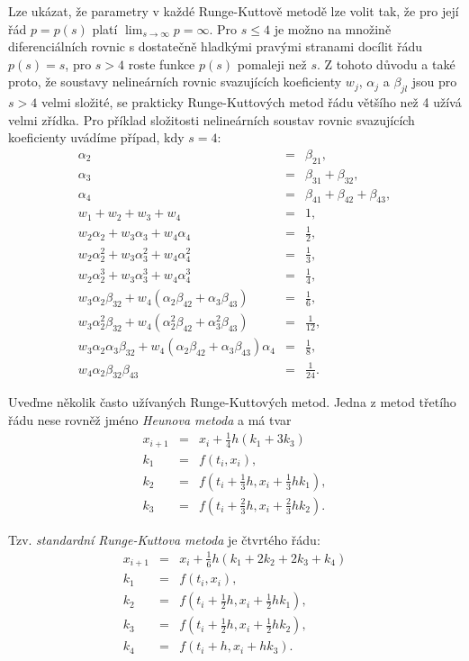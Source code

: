 \documentclass[a4paper, 12pt]{book}
\theoremstyle{definition}
\def\to{\rightarrow}
\begin{document}
Lze ukázat, že parametry v každé Runge-Kuttově metodě lze volit tak, že pro její 
řád $p=p(s)$ platí $\lim_{s\to\infty} p = \infty$. Pro $s\leq 4$ je možno na 
množině diferenciálních rovnic s dostatečně hladkými pravými stranami docílit
řádu $p(s)=s$, pro $s>4$ roste funkce $p(s)$ pomaleji než $s$. Z tohoto důvodu
a také proto, že soustavy nelineárních rovnic svazujících koeficienty $w_j$, 
$\alpha_j$ a $\beta_{jl}$ jsou pro $s>4$ velmi složité, se prakticky 
Runge-Kuttových metod řádu většího než 4 užívá velmi zřídka.
Pro příklad složitosti nelineárních soustav rovnic svazujících koeficienty 
uvádíme případ, kdy $s=4$:
\begin{eqnarray*}
\alpha_2 &=& \beta_{21},\\
\alpha_3 &=& \beta_{31}+\beta_{32},\\
\alpha_4 &=& \beta_{41}+\beta_{42}+\beta_{43},\\
w_1+w_2+w_3+w_4 &=& 1,\\
w_2\alpha_2+w_3\alpha_3+w_4\alpha_4 &=& \frac 12,\\
w_2\alpha_2^2+w_3\alpha_3^2+w_4\alpha_4^2 &=& \frac 13,\\
w_2\alpha_2^3+w_3\alpha_3^3+w_4\alpha_4^3 &=& \frac 14,\\
w_3\alpha_2\beta_{32}+w_4(\alpha_2\beta_{42}+\alpha_3\beta_{43})&=& \frac 16,\\
w_3\alpha_2^2\beta_{32}+w_4(\alpha_2^2\beta_{42}+\alpha_3^2\beta_{43})&=& \frac 1{12},\\
w_3\alpha_2\alpha_3\beta_{32}+w_4(\alpha_2\beta_{42}+\alpha_3\beta_{43})\alpha_4&=& \frac 18,\\
w_4\alpha_2\beta_{32}\beta_{43}&=& \frac 1{24}.
\end{eqnarray*}

Uveďme několik často užívaných Runge-Kuttových metod. Jedna z metod třetího 
řádu nese rovněž jméno {\em Heunova metoda} a má tvar
\begin{eqnarray*}
x_{i+1} &=& x_i+ \frac 14 h (k_1+3k_3)\\
k_1 &=& f(t_i,x_i),\\
k_2 &=& f(t_i+\frac 13 h,x_i+\frac 13 hk_1),\\
k_3 &=& f(t_i+\frac 23 h,x_i+\frac 23 hk_2).
\end{eqnarray*}

Tzv. {\em standardní Runge-Kuttova metoda} je čtvrtého řádu:
\begin{eqnarray*}
x_{i+1} &=& x_i+ \frac 16 h (k_1+2k_2+2k_3+k_4)\\
k_1 &=& f(t_i,x_i),\\
k_2 &=& f(t_i+\frac 12 h,x_i+\frac 12 hk_1),\\
k_3 &=& f(t_i+\frac 12 h,x_i+\frac 12 hk_2),\\
k_4 &=& f(t_i+h,x_i+hk_3).
\end{eqnarray*}
\end{document}
